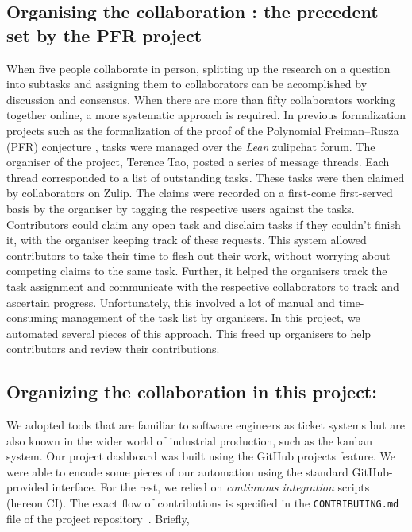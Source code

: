 \subsection{Organising the collaboration : the precedent set by the PFR project}
When five people collaborate in person, splitting up the research on a question into subtasks and assigning them to collaborators can be accomplished by discussion and consensus. When there are more than fifty collaborators working together online, a more systematic approach is required. In previous formalization projects such as the formalization of the proof of the Polynomial Freiman--Rusza (PFR) conjecture \cite{PFR_Tao_Dilles_2023}, tasks were managed over the \emph{Lean} zulipchat forum. The organiser of the project, Terence Tao, posted a series of message threads. Each thread corresponded to a list of outstanding tasks. These tasks were then claimed by collaborators on Zulip. The claims were recorded on a first-come first-served basis by the organiser by tagging the respective users against the tasks. Contributors could claim any open task and disclaim tasks if they couldn't finish it, with the organiser keeping track of these requests. This system allowed contributors to take their time to flesh out their work, without worrying about competing claims to the same task. Further, it helped the organisers track the task assignment and communicate with the respective collaborators to track and ascertain progress. Unfortunately, this involved a lot of manual and time-consuming management of the task list by organisers. In this project, we automated several pieces of this approach. This freed up organisers to help contributors and review their contributions.

\subsection{Organizing the collaboration in this project:}
We adopted tools that are familiar to software engineers as ticket systems but are also known in the wider world of industrial production, such as the kanban system. Our project dashboard was built using the GitHub projects feature. We were able to encode some pieces of our automation using the standard GitHub-provided interface. For the rest, we relied on \emph{continuous integration} scripts (hereon CI\@). The exact flow of contributions is specified in the \texttt{CONTRIBUTING.md} file of the project repository~\cite{The_Equational_Theories_repository}. Briefly,

